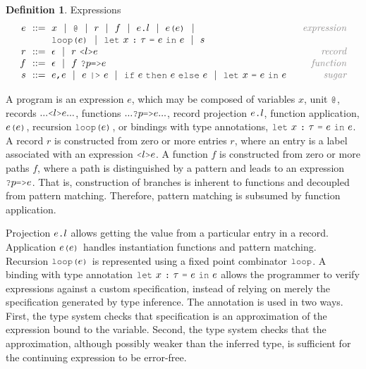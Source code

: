\documentclass[acmsmall]{acmart}
\theoremstyle{definition}
\newtheorem{definition}{Definition}[section]
\begin{document}
\begin{definition} Expressions
  \label{def:expressions}
  \[\begin{array}[t]{r@{}l@{}r}
    \nonterm{e} 
    & 
    \is 
    \begin{array}[t]{@{}l}
      x \sep 
      \J{@} \sep
      r \sep
      f \sep 
      e\J{.}l \sep
      e\J{(}e\J{)} \sep
      \\
      \J{loop(}e\J{)} \sep
      \J{let}\ x\ \J{:}\ \tau\ \J{=}\ e\ \J{in}\ e \sep
      s
    \end{array}
    & \com{expression}
    \\
    \nonterm{r} & \is \epsilon \sep r\ \J{<}l\J{>}e 
    & \com{record}
    \\
    \nonterm{f} & \is \epsilon \sep f\ \J{?}p\J{=>}e
    & \com{function}
    \\
    \nonterm{s} 
    & 
    \is 
    \begin{array}[t]{@{}l}
      e \J{,} e \sep
      e\ \J{|>}\ e \sep
      \J{if}\ e\ \J{then}\ e\ \J{else}\ e \sep
      \J{let}\ x\ \J{=}\ e\ \J{in}\ e
    \end{array}
    & \com{sugar}
  \end{array}\]
\end{definition}

\noindent
A program is an expression $e$, which may be composed of variables $x$, unit $\J{@}$,
records $... \J{<}l\J{>} e ...$, functions $...\J{?}p \J{=>} e ...$, record
projection $e\J{.}l$, function application, $e\J{(}e\J{)}$, recursion $\J{loop(}e\J{)}$,
or bindings with type annotations, $\J{let}\ x\ \J{:}\ \tau\ \J{=}\ e\ \J{in}\ e$.
A record $r$ is constructed from zero or more entries $r$, where an entry
is a label associated with an expression $\J{<}l\J{>}e$.
A function $f$ is constructed from zero or more paths $f$, where a path is distinguished by a pattern
and leads to an expression $\J{?}p \J{=>} e$.
That is, construction of branches is inherent to functions and decoupled from pattern matching.
Therefore, pattern matching is subsumed by function application.

Projection $e\J{.}l$ allows getting the value from a particular entry in a record. 
Application $e\J{(}e\J{)}$ handles instantiation functions and pattern matching. 
Recursion $\J{loop(}e\J{)}$ is represented using a fixed point combinator $\J{loop}$.
A binding with type annotation $\J{let}\ x\ \J{:}\ \tau\ \J{=}\ e\ \J{in}\ e$ allows the programmer 
to verify expressions against a custom specification, instead of relying on merely 
the specification generated by type inference.
The annotation is used in two ways. First, the type system checks that specification is an approximation
of the expression bound to the variable. Second, the type system checks that the approximation,
although possibly weaker than the inferred type, is sufficient for the continuing expression to be error-free. 
\end{document}
